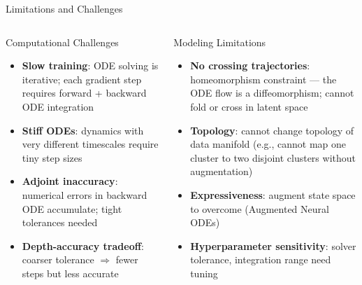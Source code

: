 \documentclass[aspectratio=169,xcolor=dvipsnames,svgnames,x11names,fleqn]{beamer}
\begin{document}
\begin{frame}{Limitations and Challenges}
\scriptsize
\begin{columns}
\begin{tblockWing}{Computational Challenges}
\begin{itemize}
  \item \textbf{Slow training}: ODE solving is iterative; each gradient step requires forward + backward ODE integration
  \item \textbf{Stiff ODEs}: dynamics with very different timescales require tiny step sizes
  \item \textbf{Adjoint inaccuracy}: numerical errors in backward ODE accumulate; tight tolerances needed
  \item \textbf{Depth-accuracy tradeoff}: coarser tolerance $\Rightarrow$ fewer steps but less accurate
\end{itemize}
\end{tblockWing}
\begin{tblockWing}{Modeling Limitations}
\begin{itemize}
  \item \textbf{No crossing trajectories}: homeomorphism constraint — the ODE flow is a diffeomorphism; cannot fold or cross in latent space
  \item \textbf{Topology}: cannot change topology of data manifold (e.g., cannot map one cluster to two disjoint clusters without augmentation)
  \item \textbf{Expressiveness}: augment state space to overcome (Augmented Neural ODEs)
  \item \textbf{Hyperparameter sensitivity}: solver tolerance, integration range need tuning
\end{itemize}
\end{tblockWing}
\end{columns}
\end{frame}
 
\end{document}
